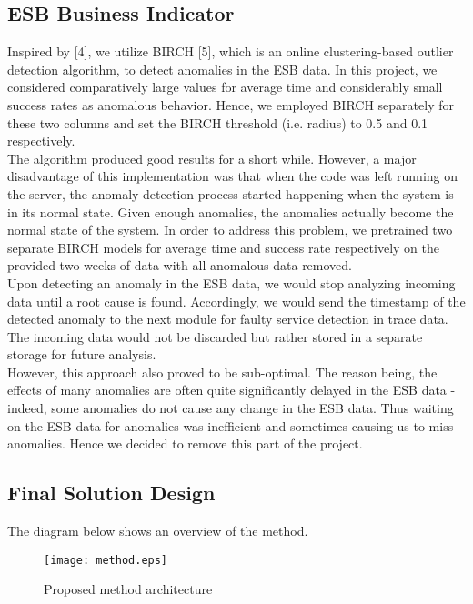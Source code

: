 \documentclass[12pt]{article}
\begin{document}
\subsection{ESB Business Indicator}
\smallskip
\smallskip
\noindent Inspired by [4], we utilize BIRCH [5], which is an online clustering-based outlier detection algorithm, to detect anomalies in the ESB data. In this project, we considered comparatively large values for average time and considerably small success rates as anomalous behavior. Hence, we employed BIRCH separately for these two columns and set the BIRCH threshold (i.e. radius) to 0.5 and 0.1 respectively. 
\\
The algorithm produced good results for a short while. However, a major disadvantage of this implementation was that when the code was left running on the server, the anomaly detection process started happening when the system is in its normal state. Given enough anomalies, the anomalies actually become the normal state of the system. In order to address this problem, we pretrained two separate BIRCH models for average time and success rate respectively on the provided two weeks of data with all anomalous data removed.
\\
Upon detecting an anomaly in the ESB data, we would stop analyzing incoming data until a root cause is found. Accordingly, we would send the timestamp of the detected anomaly to the next module for faulty service detection in trace data. The incoming data would not be discarded but rather stored in a separate storage for future analysis.
\\
However, this approach also proved to be sub-optimal. The reason being, the effects of many anomalies are often quite significantly delayed in the ESB data - indeed, some anomalies do not cause any change in the ESB data. Thus waiting on the ESB data for anomalies was inefficient and sometimes causing us to miss anomalies. Hence we decided to remove this part of the project.
\vspace{-0.2cm}


\subsection{Final Solution Design}
\smallskip\smallskip
The diagram below shows an overview of the method.
\begin{figure}[H]
\texttt{[image: method.eps]}
\caption{Proposed method architecture}
\end{figure}
\end{document}
